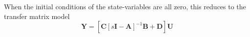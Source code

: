 When the initial conditions of the state-variables are all zero,
this reduces to the transfer matrix model
\begin{equation}\label{eqn:transfer-function}
  \mathbf{Y}=\left[\mathbf{C}\left[s\mathbf{I}-\mathbf{A}\right]^{-1}\mathbf{B}+\mathbf{D}\right]\mathbf{U}
\end{equation}

\endinput

